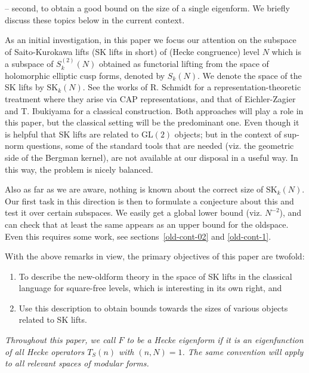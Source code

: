 \documentclass[11pt]{amsart}
\numberwithin{equation}{section}
\theoremstyle{plain}
\theoremstyle{definition}
\newcommand{\mrm}{\mathrm}
\newcommand{\skkn}{\mrm{SK}_k(N)}
\begin{document}
-- second, to obtain a good bound on the size of a single eigenform. We briefly discuss these topics below in the current context.

As an initial investigation, in this paper we focus our attention on the subspace of Saito-Kurokawa lifts (SK lifts in short) of (Hecke congruence) level $N$ which is a subspace of $S^{(2)}_k(N)$ obtained as functorial lifting from the space of holomorphic elliptic cusp forms, denoted by $S_k(N)$. We denote the space of the SK lifts by $\skkn$.
See the works of R. Schmidt \cite{schmidt-SKlift} for a representation-theoretic treatment where they arise via CAP representations, and that of Eichler-Zagier \cite{EZ} and T. Ibukiyama \cite{Ibu-SK} for a classical construction. Both approaches will play a role in this paper, but the classical setting will be the predominant one. Even though it is helpful that SK lifts are related to $\mrm{GL}(2)$
 objects; but in the context of sup-norm questions, some of the standard tools that are needed (viz. the geometric side of the Bergman kernel), are not available at our disposal in a useful way. In this way, the problem is nicely balanced. 

Also as far as we are aware, nothing is known about the correct size of $\skkn$. Our first task in this direction is then to formulate a conjecture about this and test it over certain subspaces. We easily get a global lower bound (viz. $N^{-2}$), and can check that at least the same appears as an upper bound for the oldspace. Even this requires some work, see sections~\ref{old-cont-02} and \ref{old-cont-1}. 

With the above remarks in view, the primary objectives of this paper are twofold:
\begin{enumerate}
    \item[(i)] To describe the new-oldform theory in the space of SK lifts in the classical language for square-free levels, which is interesting in its own right, and
    \item[(ii)] Use this description to obtain bounds towards the sizes of various objects related to SK lifts.
\end{enumerate}

\textit{Throughout this paper, we call $F$ to be a Hecke eigenform if it is an eigenfunction of all Hecke operators $T_S(n)$ with $(n,N)=1$. The same convention will apply to all relevant spaces of modular forms.}
\end{document}
